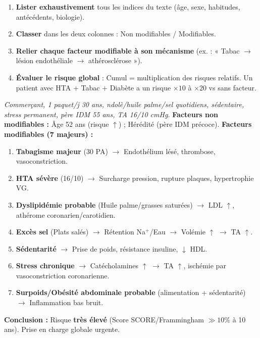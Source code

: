 \documentclass[11pt]{article}
\begin{document}
\begin{methode}
\begin{enumerate}
\item \textbf{Lister exhaustivement} tous les indices du texte (âge, sexe, habitudes, antécédents, biologie).
\item \textbf{Classer} dans les deux colonnes : Non modifiables / Modifiables.
\item \textbf{Relier chaque facteur modifiable à son mécanisme} (ex. : « Tabac $\rightarrow$ lésion endothéliale $\rightarrow$ athérosclérose »).
\item \textbf{Évaluer le risque global} : Cumul = multiplication des risques relatifs. Un patient avec HTA + Tabac + Diabète a un risque $\times 10$ à $\times 20$ vs sans facteur.
\end{enumerate}
\end{methode}

\begin{exoresolu}
\textit{Commerçant, 1 paquet/j 30 ans, ndolè/huile palme/sel quotidiens, sédentaire, stress permanent, père IDM 55 ans, TA 16/10 cmHg.}
\tcblower
\textbf{Facteurs non modifiables :} Âge 52 ans (risque $\uparrow$) ; Hérédité (père IDM précoce).
\textbf{Facteurs modifiables (7 majeurs) :}
\begin{enumerate}
\item \textbf{Tabagisme majeur} (30 PA) $\rightarrow$ Endothélium lésé, thrombose, vasoconstriction.
\item \textbf{HTA sévère} (16/10) $\rightarrow$ Surcharge pression, rupture plaques, hypertrophie VG.
\item \textbf{Dyslipidémie probable} (Huile palme/grasses saturées) $\rightarrow$ LDL $\uparrow$, athérome coronarien/carotidien.
\item \textbf{Excès sel} (Plats salés) $\rightarrow$ Rétention Na$^+$/Eau $\rightarrow$ Volémie $\uparrow$ $\rightarrow$ TA $\uparrow$.
\item \textbf{Sédentarité} $\rightarrow$ Prise de poids, résistance insuline, $\downarrow$ HDL.
\item \textbf{Stress chronique} $\rightarrow$ Catécholamines $\uparrow$ $\rightarrow$ TA $\uparrow$, ischémie par vasoconstriction coronarienne.
\item \textbf{Surpoids/Obésité abdominale probable} (alimentation + sédentarité) $\rightarrow$ Inflammation bas bruit.
\end{enumerate}
\textbf{Conclusion :} Risque \textbf{très élevé} (Score SCORE/Frammingham $\gg 10\%$ à 10 ans). Prise en charge globale urgente.
\end{exoresolu}
\end{document}
